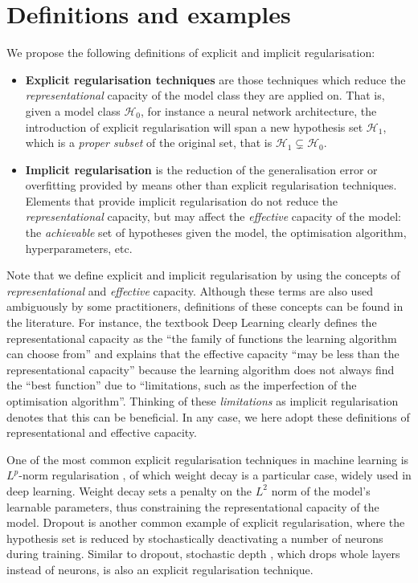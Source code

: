{\section{Definitions and examples}
\label{sec:reg-definitions}
We propose the following definitions of explicit and implicit regularisation:

\begin{itemize}
\item \textbf{Explicit regularisation techniques} are those techniques which reduce the \textit{representational} capacity of the model class they are applied on. That is, given a model class $\mathcal{H}_0$, for instance a neural network architecture, the introduction of explicit regularisation will span a new hypothesis set $\mathcal{H}_1$,  which is a \textit{proper subset} of the original set, that is $\mathcal{H}_1 \subsetneq \mathcal{H}_0$.
\item \textbf{Implicit regularisation} is the reduction of the generalisation error or overfitting provided by means other than explicit regularisation techniques. Elements that provide implicit regularisation do not reduce the \textit{representational} capacity, but may affect the \textit{effective} capacity of the model: the \textit{achievable} set of hypotheses given the model, the optimisation algorithm, hyperparameters, etc.
\end{itemize}

Note that we define explicit and implicit regularisation by using the concepts of \textit{representational} and \textit{effective} capacity. Although these terms are also used ambiguously by some practitioners, definitions of these concepts can be found in the literature. For instance, the textbook Deep Learning \citep{goodfellow2016dlbook} clearly defines the representational capacity as the ``the family of functions the learning algorithm can choose from'' and explains that the effective capacity ``may be less than the representational capacity'' because the learning algorithm does not always find the ``best function'' due to ``limitations, such as the imperfection of the optimisation algorithm''. Thinking of these \textit{limitations} as implicit regularisation denotes that this can be beneficial. In any case, we here adopt these definitions of representational and effective capacity.

One of the most common explicit regularisation techniques in machine learning is $L^p$-norm regularisation \citep{tikhonov1963regularisation}, of which weight decay is a particular case, widely used in deep learning. Weight decay sets a penalty on the $L^2$ norm of the model's learnable parameters, thus constraining the representational capacity of the model. Dropout \citep{srivastava2014dropout} is another common example of explicit regularisation, where the hypothesis set is reduced by stochastically deactivating a number of neurons during training. Similar to dropout, stochastic depth \citep{huang2016stochasticdepth}, which drops whole layers instead of neurons, is also an explicit regularisation technique.

}
